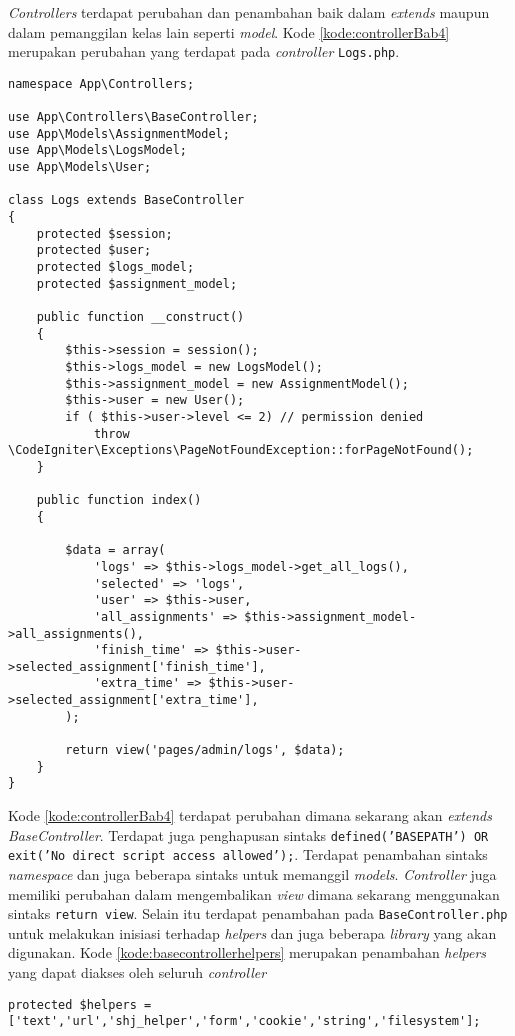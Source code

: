 \textit{Controllers} terdapat perubahan dan penambahan baik dalam \textit{extends} maupun dalam pemanggilan kelas lain seperti \textit{model}. Kode \ref{kode:controllerBab4} merupakan perubahan yang terdapat pada \textit{controller} \texttt{Logs.php}.

\begin{lstlisting}[caption=Perubahan kode \textit{controllers} pada \textit{CodeIgniter 4}, label=kode:controllerBab4]
namespace App\Controllers;

use App\Controllers\BaseController;
use App\Models\AssignmentModel;
use App\Models\LogsModel;
use App\Models\User;

class Logs extends BaseController
{
	protected $session;
	protected $user;
	protected $logs_model;
	protected $assignment_model;

	public function __construct()
	{
		$this->session = session();
		$this->logs_model = new LogsModel();
		$this->assignment_model = new AssignmentModel();
		$this->user = new User();
		if ( $this->user->level <= 2) // permission denied
			throw \CodeIgniter\Exceptions\PageNotFoundException::forPageNotFound();
	}
	
	public function index()
	{

		$data = array(
			'logs' => $this->logs_model->get_all_logs(),
			'selected' => 'logs',
			'user' => $this->user,
			'all_assignments' => $this->assignment_model->all_assignments(),
			'finish_time' => $this->user->selected_assignment['finish_time'],
			'extra_time' => $this->user->selected_assignment['extra_time'],
		);

		return view('pages/admin/logs', $data);
	}
}
\end{lstlisting}

Kode \ref{kode:controllerBab4} terdapat perubahan dimana sekarang akan \textit{extends} \textit{BaseController}. Terdapat juga penghapusan sintaks \texttt{defined('BASEPATH') OR exit('No direct script access allowed');}. Terdapat penambahan sintaks \textit{namespace} dan juga beberapa sintaks untuk memanggil \textit{models}. \textit{Controller} juga memiliki perubahan dalam mengembalikan \textit{view} dimana sekarang menggunakan sintaks \texttt{return view}. Selain itu terdapat penambahan pada \texttt{BaseController.php} untuk melakukan inisiasi terhadap \textit{helpers} dan juga beberapa \textit{library} yang akan digunakan. Kode \ref{kode:basecontrollerhelpers} merupakan penambahan \textit{helpers} yang dapat diakses oleh seluruh \textit{controller}

\begin{lstlisting}[caption=Penambahan kode pada \texttt{BaseController}, label=kode:basecontrollerhelpers]
	protected $helpers = ['text','url','shj_helper','form','cookie','string','filesystem'];
\end{lstlisting}

